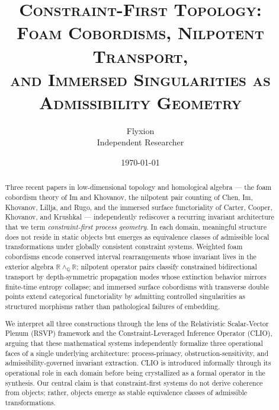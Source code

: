 \documentclass[12pt, a4paper]{article}
\theoremstyle{plain}
\theoremstyle{definition}
\theoremstyle{correspondence}
\newcommand{\RR}{\mathbb{R}}
\newcommand{\QQ}{\mathbb{Q}}
\newcommand{\wedgeQ}{\wedge_{\QQ}}
\begin{document}
\title{\large\scshape Constraint-First Topology:\\
\normalfont\large Foam Cobordisms, Nilpotent Transport,\\
and Immersed Singularities as Admissibility Geometry}

\author{\normalsize Flyxion \\ \small Independent Researcher}

\date{\small\today}

\maketitle

\begin{abstract}
Three recent papers in low-dimensional topology and homological algebra --- the
foam cobordism theory of Im and Khovanov, the nilpotent pair counting of Chen,
Im, Khovanov, Lillja, and Rugo, and the immersed surface functoriality of Carter,
Cooper, Khovanov, and Krushkal --- independently rediscover a recurring invariant
architecture that we term \emph{constraint-first process geometry}. In each domain,
meaningful structure does not reside in static objects but emerges as equivalence
classes of admissible local transformations under globally consistent constraint
systems. Weighted foam cobordisms encode conserved interval rearrangements whose
invariant lives in the exterior algebra $\RR \wedgeQ \RR$; nilpotent operator pairs
classify constrained bidirectional transport by depth-symmetric propagation modes
whose extinction behavior mirrors finite-time entropy collapse; and immersed surface
cobordisms with transverse double points extend categorical functoriality by
admitting controlled singularities as structured morphisms rather than pathological
failures of embedding.

We interpret all three constructions through the lens of the Relativistic Scalar-Vector
Plenum (RSVP) framework and the Constraint-Leveraged Inference Operator (CLIO),
arguing that these mathematical systems independently formalize three operational
faces of a single underlying architecture: process-primacy, obstruction-sensitivity,
and admissibility-governed invariant extraction. CLIO is introduced informally
through its operational role in each domain before being crystallized as a formal
operator in the synthesis. Our central claim is that constraint-first systems do not
derive coherence from objects; rather, objects emerge as stable equivalence classes
of admissible transformations.
\end{abstract}
\end{document}
